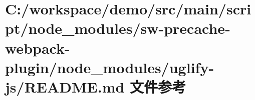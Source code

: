 \hypertarget{node__modules_2sw-precache-webpack-plugin_2node__modules_2uglify-js_2_r_e_a_d_m_e_8md}{}\section{C\+:/workspace/demo/src/main/script/node\+\_\+modules/sw-\/precache-\/webpack-\/plugin/node\+\_\+modules/uglify-\/js/\+R\+E\+A\+D\+ME.md 文件参考}
\label{node__modules_2sw-precache-webpack-plugin_2node__modules_2uglify-js_2_r_e_a_d_m_e_8md}
